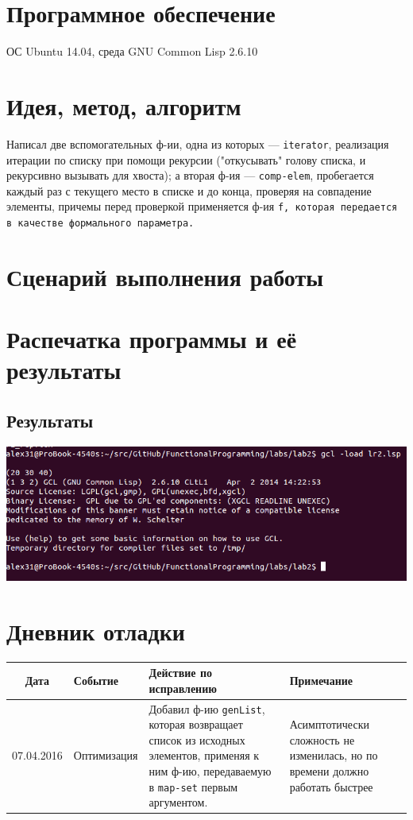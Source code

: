 \documentclass[12pt]{article}
\begin{document}
\section{Программное обеспечение}
ОС Ubuntu 14.04, среда GNU Common Lisp 2.6.10

\section{Идея, метод, алгоритм}
Написал две вспомогательных ф-ии, одна из которых --- {\color{blue}\tt{iterator}}, реализация итерации по списку при помощи рекурсии ("откусывать" голову списка, и рекурсивно вызывать для хвоста); а вторая ф-ия --- {\color{blue}\tt{comp-elem}}, пробегается каждый раз с текущего место в списке и до конца, проверяя на совпадение элементы, причемы перед проверкой применяется ф-ия \tt{f}, которая передается в качестве формального параметра.

\section{Сценарий выполнения работы}
\section{Распечатка программы и её результаты}

\subsection{Результаты}
\includegraphics[scale=0.7]{lr2Screen}

%

\section{Дневник отладки}
\begin{tabular}{|c|p{5cm}|p{5cm}|p{3cm}|}
\hline
Дата & Событие & Действие по исправлению & Примечание \\
\hline
07.04.2016 & Оптимизация & Добавил ф-ию {\color{red}\tt{genList}}, которая возвращает список
из исходных элементов, применяя к ним ф-ию, передаваемую в {\color{red}\tt{map-set}} первым аргументом.
& Асимптотически сложность не изменилась, но по времени должно работать быстрее \\
\hline 
\end{tabular}
\end{document}

